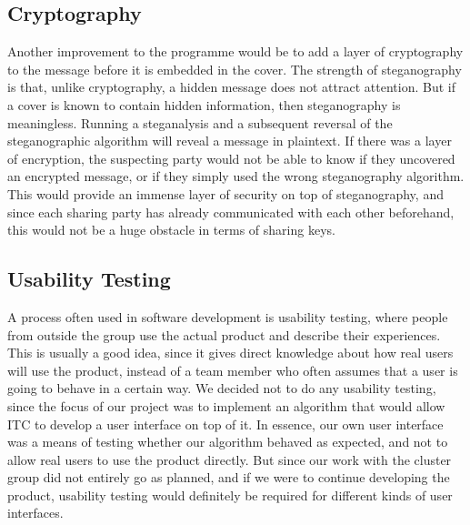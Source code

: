 \subsection{Cryptography}
Another improvement to the programme would be to add a layer of cryptography to the message before it is embedded in the cover.
The strength of steganography is that, unlike cryptography, a hidden message does not attract attention.
But if a cover is known to contain hidden information, then steganography is meaningless.
Running a steganalysis and a subsequent reversal of the steganographic algorithm will reveal a message in plaintext.
If there was a layer of encryption, the suspecting party would not be able to know if they uncovered an encrypted message, or if they simply used the wrong steganography algorithm.
This would provide an immense layer of security on top of steganography, and since each sharing party has already communicated with each other beforehand, this would not be a huge obstacle in terms of sharing keys.

\subsection{Usability Testing}
A process often used in software development is usability testing, where people from outside the group use the actual product and describe their experiences.
This is usually a good idea, since it gives direct knowledge about how real users will use the product, instead of a team member who often assumes that a user is going to behave in a certain way.
We decided not to do any usability testing, since the focus of our project was to implement an algorithm that would allow ITC to develop a user interface on top of it.
In essence, our own user interface was a means of testing whether our algorithm behaved as expected, and not to allow real users to use the product directly.
But since our work with the cluster group did not entirely go as planned, and if we were to continue developing the product, usability testing would definitely be required for different kinds of user interfaces.
